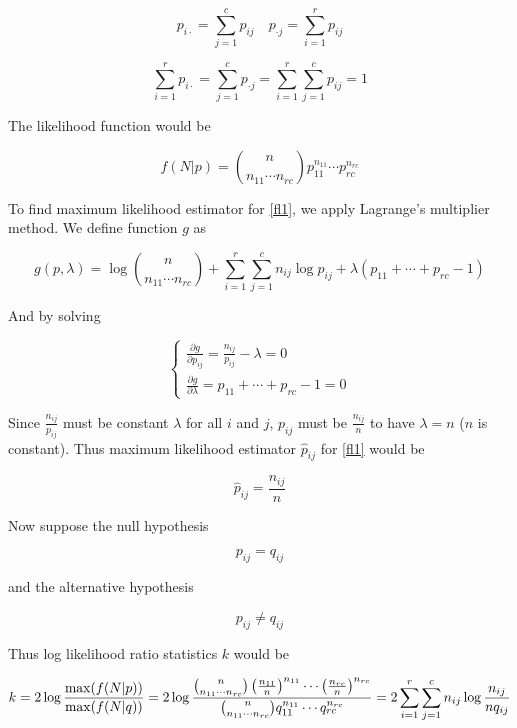 \[
p_{i\cdot} = \sum_{j=1}^{c}p_{ij}\quad
p_{\cdot j} = \sum_{i=1}^{r}p_{ij}
\]

\begin{equation}
\sum_{i=1}^{r}p_{i\cdot} = \sum_{j=1}^{c}p_{\cdot j} 
= \sum_{i=1}^{r}\sum_{j=1}^{c}p_{ij} = 1
\end{equation}

The likelihood function would be

\begin{equation}
f(N|p) = 
{n\choose{n_{11} \cdots n_{rc}}}p_{11}^{n_{11}}\cdots p_{rc}^{n_{rc}}
\label{fl1}
\end{equation}

To find maximum likelihood estimator for \ref{fl1}, we apply
Lagrange's multiplier method. We define function \(g\) as

\begin{equation}
g(p,\lambda) = \log{n\choose{n_{11} \cdots n_{rc}}} 
             + \sum_{i=1}^{r}\sum_{j=1}^{c}n_{ij}\log p_{ij}
             + \lambda(p_{11} + \cdots + p_{rc} - 1)
\end{equation}

And by solving

\[
\left\{
\begin{array}{l}
\frac{\partial g}{\partial p_{ij}} = \frac{n_{ij}}{p_{ij}} - \lambda = 0\\
\frac{\partial g}{\partial \lambda} = p_{11} + \cdots + p_{rc} - 1 = 0
\end{array}\right.
\]

Since \(\frac{n_{ij}}{p_{ij}}\) must be constant \(\lambda\) for all
\(i\) and \(j\), \(p_{ij}\) must be \(\frac{n_{ij}}{n}\) to have
\(\lambda = n\) (\(n\) is constant). Thus maximum
likelihood estimator \(\hat p_{ij}\) for \ref{fl1} would be 

\[
\hat p_{ij} = \frac{n_{ij}}{n}
\]

Now suppose the null hypothesis 

\[
p_{ij} = q_{ij}
\]

and the alternative hypothesis

\[
p_{ij} \neq q_{ij}
\]

Thus log likelihood ratio statistics \(k\) would be

\begin{equation}
k = 2\log\frac{{\rm max}(f(N|p))}{{\rm max}(f(N|q))}
 = 2\log\frac{{n\choose{n_{11} \cdots n_{rc}}}\left(\frac{n_{11}}{n}\right)^{n_{11}} \cdots \left(\frac{n_{rc}}{n}\right)^{n_{rc}}}
{{n\choose{n_{11} \cdots n_{rc}}}q_{11}^{n_{11}} \cdots q_{rc}^{n_{rc}}}
= 2\sum_{i=1}^{r}\sum_{j=1}^{c}n_{ij}\log\frac{n_{ij}}{nq_{ij}}
\label{fl2}
\end{equation}

